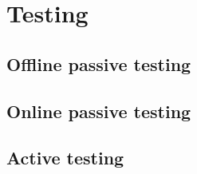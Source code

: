 %
\chapter{Testing}
\label{sec:testing}

\section{Offline passive testing}
\label{sec:testing:offpassive}

\section{Online passive testing}
\label{sec:testing:onpassive}

\section{Active testing}
\label{sec:testing:active}
